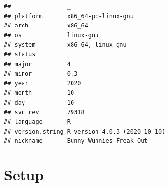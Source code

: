 \documentclass[]{book}
\begin{document}
\begin{verbatim}
##                _                           
## platform       x86_64-pc-linux-gnu         
## arch           x86_64                      
## os             linux-gnu                   
## system         x86_64, linux-gnu           
## status                                     
## major          4                           
## minor          0.3                         
## year           2020                        
## month          10                          
## day            10                          
## svn rev        79318                       
## language       R                           
## version.string R version 4.0.3 (2020-10-10)
## nickname       Bunny-Wunnies Freak Out
\end{verbatim}

\hypertarget{setup-3}{%
\section{Setup}\label{setup-3}}
\end{document}
